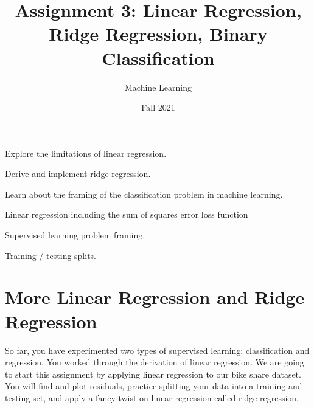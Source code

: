 \documentclass[assignment03_Solutions]{subfiles}
\title{Assignment 3: Linear Regression, Ridge Regression, Binary Classification}
\author{Machine Learning}
\date{Fall 2021}
\begin{document}
\maketitle
\thispagestyle{firstpage}


\begin{learningobjectives}
\bi
\item Explore the limitations of linear regression.
\item Derive and implement ridge regression.
\item Learn about the framing of the classification problem in machine learning.
\ei
\end{learningobjectives}

\begin{priorknowledge}
\bi
\item Linear regression including the sum of squares error loss function
\item Supervised learning problem framing.
\item Training / testing splits.
\ei
\end{priorknowledge}
\vspace{1em}

%
%


\section{More Linear Regression and Ridge Regression}

So far, you have experimented two types of supervised learning: classification and regression. You worked through the derivation of linear regression. We are going to start this assignment by applying linear regression to our bike share dataset. You will find and plot residuals, practice splitting your data into a training and testing set, and apply a fancy twist on linear regression called ridge regression.
\end{document}
